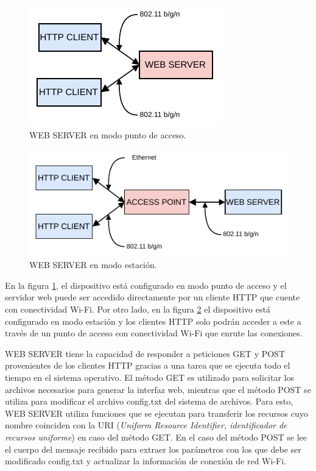 \begin{figure}[h]
	\centering
	\includegraphics[scale=1]{./Figures/web_server_ap.pdf}
	\caption{WEB SERVER en modo punto de acceso.}
		\label{fig:serverAP}
\end{figure}

\begin{figure}[h]
	\centering
	\includegraphics[scale=1]{./Figures/web_server_sta.pdf}
	\caption{WEB SERVER en modo estación.}
		\label{fig:serverSTA}
\end{figure}

En la figura \ref{fig:serverAP}, el dispositivo está configurado en modo punto de acceso y el servidor web puede ser accedido directamente por un cliente HTTP que cuente con conectividad Wi-Fi. Por otro lado, en la figura \ref{fig:serverSTA} el dispositivo está configurado en modo estación y los clientes HTTP solo podrán acceder a este a través de un punto de acceso con conectividad Wi-Fi que enrute las conexiones.

WEB SERVER tiene la capacidad de responder a peticiones GET y POST provenientes de los clientes HTTP gracias a una tarea que se ejecuta todo el tiempo en el sistema operativo. El método GET es utilizado para solicitar los archivos necesarios para generar la interfaz web, mientras que el método POST se utiliza para modificar el archivo config.txt del sistema de archivos. Para esto, WEB SERVER utiliza funciones que se ejecutan para transferir los recursos cuyo nombre coinciden con la URI (\textit{Uniform Resource Identifier, identificador de recursos uniforme}) en caso del método GET. En el caso del método POST se lee el cuerpo del mensaje recibido para extraer los parámetros con los que debe ser modificado config.txt y actualizar la información de conexión de red Wi-Fi.

